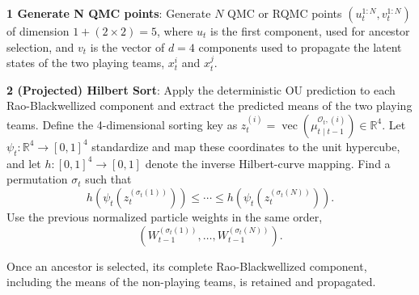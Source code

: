 
\textbf{1 Generate N QMC points}: Generate $N$ QMC or RQMC points $(u_t^{1:N}, v_t^{1:N})$ of dimension $1 + (2 \times 2) = 5$, where $u_t$ is the first component, used for ancestor selection, and $v_t$ is the vector of $d = 4$ components used to propagate the latent states of the two playing teams, $x_t^i$ and $x_t^j$.

\textbf{2 (Projected) Hilbert Sort}: Apply the deterministic OU prediction to each Rao-Blackwellized component and extract the predicted means of the two playing teams. Define the 4-dimensional sorting key as $z_t^{(i)} = \operatorname{vec}\left( \mu_{t\mid t-1}^{\mathcal{O}_t,(i)} \right) \in \mathbb{R}^4$. Let $\psi_t:\mathbb{R}^4\rightarrow[0,1]^4$ standardize and map these coordinates to the unit hypercube, and let $h:[0,1]^4\rightarrow[0,1]$ denote the inverse Hilbert-curve mapping. Find a permutation $\sigma_t$ such that
\begin{equation}
    h\left(\psi_t(z_t^{(\sigma_t(1))})\right) \leq \cdots \leq h\left(\psi_t(z_t^{(\sigma_t(N))})\right). \nonumber
\end{equation}
Use the previous normalized particle weights in the same order,
\begin{equation}
    \left( W_{t-1}^{(\sigma_t(1))}, \ldots, W_{t-1}^{(\sigma_t(N))} \right). \nonumber
\end{equation}

Once an ancestor is selected, its complete Rao-Blackwellized component, including the means of the non-playing teams, is retained and propagated.


